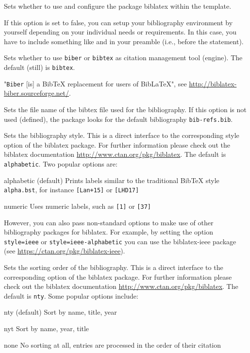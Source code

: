\documentclass{ltxdockit}
\begin{document}
\begin{optionlist}
Sets whether to use and configure the package biblatex within the template.

If this option is set to false, you can setup your bibliography environment by yourself depending on your individual needs or requirements. In this case, you have to include something like  and  in your preamble (i.e., before the  statement).


Sets whether to use \texttt{biber} or \texttt{bibtex} as citation management tool (engine).
The default (still) is \texttt{bibtex}.

"\texttt{Biber} [is] a BibTeX replacement for users of BibLaTeX", see \url{http://biblatex-biber.sourceforge.net/}.


Sets the file name of the bibtex file used for the bibliography.
If this option is not used (defined), the package looks for the default bibliography \texttt{bib-refs.bib}.


Sets the bibliography style.
This is a direct interface to the corresponding style option of the biblatex package.
For further information please check out the biblatex documentation \url{http://www.ctan.org/pkg/biblatex}.
The default is \texttt{alphabetic}.
Two popular options are:

\begin{valuelist}
\item[alphabetic] (default) Prints labels similar to the traditional BibTeX style \texttt{alpha.bst}, for instance \texttt{[Lan+15]} or \texttt{[LHD17]}
\item[numeric] Uses numeric labels, such as \texttt{[1]} or \texttt{[37]}
\end{valuelist}

However, you can also pass non-standard options to make use of other bibliography packages for biblatex.
For example, by setting the option \texttt{style=ieee} or \texttt{style=ieee-alphabetic} you can use the biblatex-ieee package (see \url{https://ctan.org/pkg/biblatex-ieee}).


Sets the sorting order of the bibliography.
This is a direct interface to the corresponding option of the biblatex package.
For further information please check out the biblatex documentation \url{http://www.ctan.org/pkg/biblatex}.
The default is \texttt{nty}.
Some popular options include:

\begin{valuelist}
\item[nty] (default) Sort by name, title, year
\item[nyt] Sort by name, year, title
\item[none] No sorting at all, entries are processed in the order of their citation
\end{valuelist}

\end{optionlist}
\end{document}
